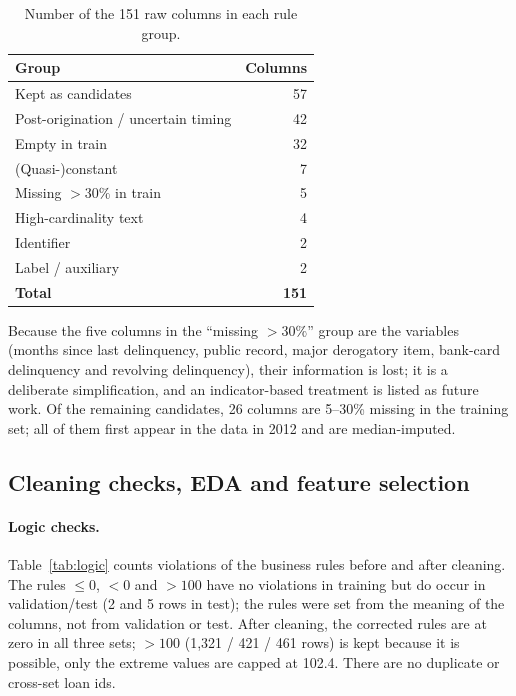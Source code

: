 \begin{table}[H]
\centering
\caption{Number of the 151 raw columns in each rule group.}
\label{tab:groups}
\begin{tabular}{lr}
\toprule
\textbf{Group} & \textbf{Columns} \\
\midrule
Kept as candidates & 57 \\
Post-origination / uncertain timing & 42 \\
Empty in train & 32 \\
(Quasi-)constant & 7 \\
Missing $>30\%$ in train & 5 \\
High-cardinality text & 4 \\
Identifier & 2 \\
Label / auxiliary & 2 \\
\midrule
\textbf{Total} & \textbf{151} \\
\bottomrule
\end{tabular}
\end{table}

Because the five columns in the ``missing $>30\%$'' group are the  variables (months since last delinquency, public record, major derogatory item, bank-card delinquency and revolving delinquency), their information is lost; it is a deliberate simplification, and an indicator-based treatment is listed as future work. Of the remaining candidates, 26 columns are 5--30\% missing in the training set; all of them first appear in the data in 2012 and are median-imputed.

\subsection{Cleaning checks, EDA and feature selection}
\label{sec:res-eda}

\paragraph{Logic checks.} Table~\ref{tab:logic} counts violations of the business rules before and after cleaning. The rules $\le 0$, $<0$ and $>100$ have no violations in training but do occur in validation/test (2 and 5 rows in test); the rules were set from the meaning of the columns, not from validation or test. After cleaning, the corrected rules are at zero in all three sets; $>100$ (1,321 / 421 / 461 rows) is kept because it is possible, only the extreme values are capped at 102.4. There are no duplicate or cross-set loan ids.

